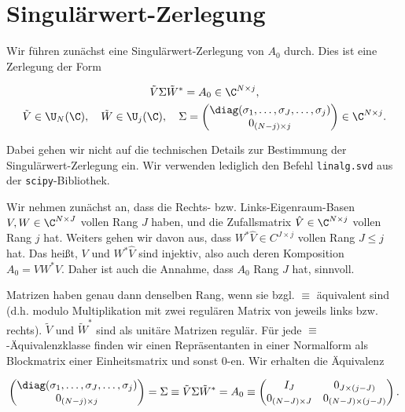 \section{Singulärwert-Zerlegung}

Wir führen zunächst eine Singulärwert-Zerlegung von $A_0$ durch.
Dies ist eine Zerlegung der Form

\begin{gather*}
    \tilde V \Sigma \tilde W^\ast = A_0 \in \C^{N \times j}, \\
    \tilde V \in \U_N(\C),
    \quad
    \tilde W \in \U_j(\C),
    \quad
    \Sigma = \begin{pmatrix}
        \diag(\sigma_1, \dots, \sigma_J, \dots, \sigma_j) \\
        0_{(N - j) \times j}
    \end{pmatrix} \in \C^{N \times j}.
\end{gather*}

Dabei gehen wir nicht auf die technischen Details zur Bestimmung der Singulärwert-Zerlegung ein.
Wir verwenden lediglich den Befehl \texttt{linalg.svd} aus der \texttt{scipy}-Bibliothek.

Wir nehmen zunächst an, dass die Rechts- bzw. Links-Eigenraum-Basen $V, W \in \C^{N \times J}$ vollen Rang $J$ haben, und die Zufallsmatrix $\hat V \in \C^{N \times j}$ vollen Rang $j$ hat.
Weiters gehen wir davon aus, dass $W^\ast \hat V \in C^{J \times j}$ vollen Rang $J \leq j$ hat.
Das heißt, $V$ und $W^\ast \hat V$ sind injektiv, also auch deren Komposition $A_0 = V W^\ast \hat V$.
Daher ist auch die Annahme, dass $A_0$ Rang $J$ hat, sinnvoll.

Matrizen haben genau dann denselben Rang, wenn sie bzgl. $\equiv$ äquivalent sind (d.h. modulo Multiplikation mit zwei regulären Matrix von jeweils links bzw. rechts).
$\tilde V$ und $\tilde W^\ast$ sind als unitäre Matrizen regulär.
Für jede $\equiv$-Äquivalenzklasse finden wir einen Repräsentanten in einer Normalform als Blockmatrix einer Einheitsmatrix und sonst $0$-en.
Wir erhalten die Äquivalenz

\begin{align*}
    \begin{pmatrix}
        \diag(\sigma_1, \dots, \sigma_J, \dots, \sigma_j) \\
        0_{(N - j) \times j}
    \end{pmatrix}
    =
    \Sigma
    \equiv
    \tilde V \Sigma \tilde W^\ast
    =
    A_0
    \equiv
    \begin{pmatrix}
        I_J & 0_{J \times (j - J)} \\ 0_{(N - J) \times J} &0_{(N - J) \times (j - J)}
    \end{pmatrix}.
\end{align*}

